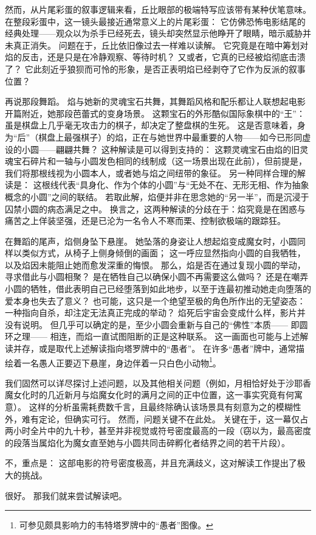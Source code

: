 然而，从片尾彩蛋的叙事逻辑来看，丘比眼部的极端特写应该带有某种伏笔意味。
在整段彩蛋中，这一镜头最接近通常意义上的片尾彩蛋：
它仿佛恐怖电影结尾的经典处理——观众以为杀手已经死去，镜头却突然显示他睁开了眼睛，暗示威胁并未真正消失。
问题在于，丘比依旧像过去一样难以读解。
它究竟是在暗中筹划对焰的反击，还是只是在冷静观察、等待时机？
又或者，它真的已经被焰彻底击溃了？
它此刻近乎狼狈而可怜的形象，是否正表明焰已经剥夺了它作为反派的叙事位置？

再说那段舞蹈。
焰与她新的灵魂宝石共舞，其舞蹈风格和配乐都让人联想起电影开篇附近，她那段芭蕾式的变身场景。
这颗宝石的外形酷似国际象棋中的“王”：虽是棋盘上几乎毫无攻击力的棋子，却决定了整盘棋的生死。
这是否意味着，身为“后”（棋盘上最强棋子）的焰，正在与她世界中最重要的人物——如今已形同虚设的小圆——翩翩共舞？
这种解读是可以得到支持的：
这颗灵魂宝石由焰的旧灵魂宝石碎片和一轴与小圆发色相同的线制成（这一场景出现在此前），但前提是，我们将那根线视为小圆本人，或者她与焰之间纽带的象征。
另一种同样合理的解读是：
这根线代表“具身化、作为个体的小圆”与“无处不在、无形无相、作为抽象概念的小圆”之间的联结。
若取此解，焰便并非在思念她的“另一半”，而是沉浸于囚禁小圆的病态满足之中。
换言之，这两种解读的分歧在于：焰究竟是在困惑与痛苦之上佯装坚强，还是已沦为一名令人不寒而栗、控制欲极端的跟踪狂。

在舞蹈的尾声，焰侧身坠下悬崖。
她坠落的身姿让人想起焰变成魔女时，小圆同样以类似方式，从椅子上侧身倾倒的画面；
这一呼应显然指向小圆的自我牺牲，以及焰因未能阻止她而愈发深重的悔恨。
那么，焰是否在通过复现小圆的举动，寻求借此与小圆相聚？
是在牺牲自己以确保小圆不再需要这么做吗？
还是在嘲弄小圆的牺牲，借此表明自己已经堕落到如此地步，以至于连最初推动她走向堕落的爱本身也失去了意义？
也可能，这只是一个绝望至极的角色所作出的无望姿态：
一种指向自杀，却注定无法真正完成的举动？
焰死后宇宙会变成什么样，影片并没有说明。
但几乎可以确定的是，至少小圆会重新与自己的“佛性”本质——
即圆环之理——
相连，而焰一直试图阻断的正是这种联系。
这一画面也可能与上述解读并存，或是取代上述解读指向塔罗牌中的“愚者”。
在许多“愚者”牌中，通常描绘着一名愚人正要迈下悬崖，身边伴着一只白色小动物\footnote{%
    可参见颇具影响力的韦特塔罗牌中的“愚者”图像。
}\cite{rider-waite-fool-image}。

我们固然可以详尽探讨上述问题，以及其他相关问题（例如，月相恰好处于沙耶香魔女化时的几近新月与焰魔女化时的满月之间的正中位置，这一事实究竟有何寓意）。%
这样的分析虽需耗费数千言，且最终除确认该场景具有刻意为之的模糊性外，难有定论，但确实可行。
然而，问题关键不在此处。
关键在于，这一幕仅占两小时全片中的九十秒，甚至并非视觉或符号密度最高的一段（窃以为，最高密度的段落当属焰化为魔女直至她与小圆共同击碎孵化者结界之间的若干片段）。

不，重点是：
这部电影的符号密度极高，并且充满歧义，这对解读工作提出了极大的挑战。

很好。
那我们就来尝试解读吧。

